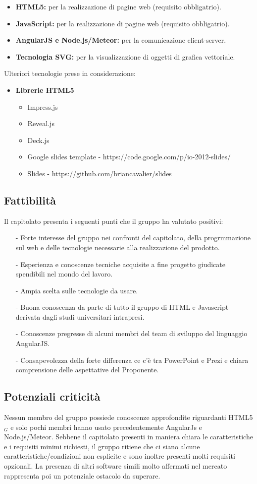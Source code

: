 \begin{itemize}
	\item \textbf{HTML5:} per la realizzazione di pagine web (requisito obbligatrio).
	\item \textbf{JavaScript:} per la realizzazione di pagine web (requisito obbligatrio).
	\item \textbf{AngularJS e Node.js/Meteor:} per la comunicazione client-server.
	\item \textbf{Tecnologia SVG:} per la visualizzazione di oggetti di grafica vettoriale.
\end{itemize}
Ulteriori tecnologie prese in considerazione:
\begin{itemize}
	\item \textbf{Librerie HTML5}
	\begin{itemize}
		\item Impress.js
		\item Reveal.js
		\item Deck.js
		\item Google slides template - https://code.google.com/p/io-2012-slides/
		\item Slides - https://github.com/briancavalier/slides
	\end{itemize}
\end{itemize}

\subsection{Fattibilità}
Il capitolato presenta i seguenti punti che il gruppo ha valutato positivi:
\begin{itemize}
	\item[-] Forte interesse del gruppo nei confronti del capitolato, della progrmmazione sul web e delle tecnologie necessarie alla realizzazione del prodotto.
	\item[-] Esperienza e conoscenze tecniche acquisite a fine progetto giudicate spendibili nel mondo del lavoro.
	\item[-] Ampia scelta sulle tecnologie da usare.
	\item[-] Buona conoscenza da parte di tutto il gruppo di HTML e Javascript derivata dagli studi universitari intrapresi.
	\item[-] Conoscenze pregresse di alcuni membri del team di sviluppo del linguaggio AngularJS.
	\item[-] Consapevolezza della forte differenza ce c'è tra PowerPoint e Prezi e chiara comprensione delle aspettative del Proponente.
\end{itemize}

\subsection{Potenziali criticità}
Nessun membro del gruppo possiede conoscenze approfondite riguardanti HTML5$_{G}$ e solo pochi membri hanno usato precedentemente AngularJs e Node.js/Meteor. Sebbene il capitolato presenti in maniera chiara le caratteristiche e i requisiti minimi richiesti, il gruppo ritiene che ci siano alcune caratteristiche/condizioni non esplicite e sono inoltre presenti molti requisiti opzionali. La presenza di altri software simili molto affermati nel mercato rappresenta poi un potenziale ostacolo da superare.